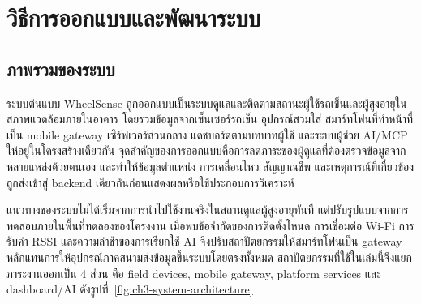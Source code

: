 \chapter{วิธีการออกแบบและพัฒนาระบบ}
\label{chapter3}

\section{ภาพรวมของระบบ}
\label{sec:ch3_system_design}
ระบบต้นแบบ WheelSense ถูกออกแบบเป็นระบบดูแลและติดตามสถานะผู้ใช้รถเข็นและผู้สูงอายุในสภาพแวดล้อมภายในอาคาร โดยรวมข้อมูลจากเซ็นเซอร์รถเข็น อุปกรณ์สวมใส่ สมาร์ทโฟนที่ทำหน้าที่เป็น mobile gateway เซิร์ฟเวอร์ส่วนกลาง แดชบอร์ดตามบทบาทผู้ใช้ และระบบผู้ช่วย AI/MCP ให้อยู่ในโครงสร้างเดียวกัน จุดสำคัญของการออกแบบคือการลดภาระของผู้ดูแลที่ต้องตรวจข้อมูลจากหลายแหล่งด้วยตนเอง และทำให้ข้อมูลตำแหน่ง การเคลื่อนไหว สัญญาณชีพ และเหตุการณ์ที่เกี่ยวข้องถูกส่งเข้าสู่ backend เดียวกันก่อนแสดงผลหรือใช้ประกอบการวิเคราะห์

แนวทางของระบบไม่ได้เริ่มจากการนำไปใช้งานจริงในสถานดูแลผู้สูงอายุทันที แต่ปรับรูปแบบจากการทดสอบภายในพื้นที่ทดลองของโครงงาน เมื่อพบข้อจำกัดของการติดตั้งโหนด การเชื่อมต่อ Wi-Fi การรับค่า RSSI และความล่าช้าของการเรียกใช้ AI จึงปรับสถาปัตยกรรมให้สมาร์ทโฟนเป็น gateway หลักแทนการให้อุปกรณ์ภาคสนามส่งข้อมูลขึ้นระบบโดยตรงทั้งหมด สถาปัตยกรรมที่ใช้ในเล่มนี้จึงแยกภาระงานออกเป็น 4 ส่วน คือ field devices, mobile gateway, platform services และ dashboard/AI ดังรูปที่~\ref{fig:ch3-system-architecture}


